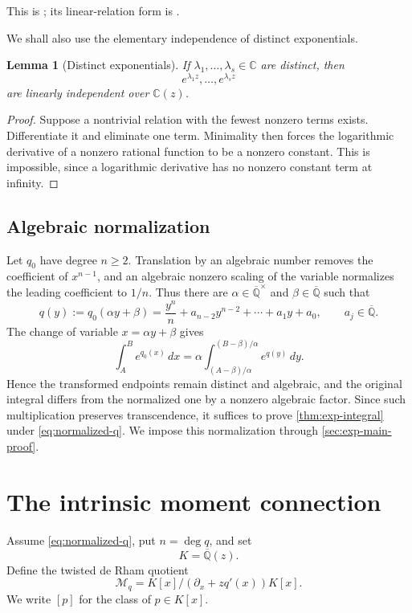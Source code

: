\documentclass[11pt]{article}
\numberwithin{equation}{section}
\newtheorem{lemma}[lemma]{Lemma}
\theoremstyle{definition}
\theoremstyle{remark}
\newcommand{\C}{\mathbb C}
\newcommand{\Qbar}{\overline{\mathbb Q}}
\newcommand{\Mcal}{\mathcal M}
\begin{document}
This is \cite[Theorem~1.3]{Beukers}; its linear-relation form is
\cite[Theorem~3.2]{Beukers}.

We shall also use the elementary independence of distinct exponentials.

\begin{lemma}[Distinct exponentials]\label{lem:exp-independent}
If $\lambda_1,\ldots,\lambda_s\in\C$ are distinct, then
\[
  e^{\lambda_1 z},\ldots,e^{\lambda_s z}
\]
are linearly independent over $\C(z)$.
\end{lemma}

\begin{proof}
Suppose a nontrivial relation with the fewest nonzero terms exists.  Differentiate it and eliminate one term.  Minimality then forces the logarithmic derivative of a nonzero rational function to be a nonzero constant.  This is impossible, since a logarithmic derivative has no nonzero constant term at infinity.
\end{proof}

\subsection{Algebraic normalization}

Let $q_0$ have degree $n\ge2$.  Translation by an algebraic number removes the coefficient of $x^{n-1}$, and an algebraic nonzero scaling of the variable normalizes the leading coefficient to $1/n$.  Thus there are $\alpha\in\Qbar^\times$ and $\beta\in\Qbar$ such that
\begin{equation}\label{eq:normalized-q}
  q(y):=q_0(\alpha y+\beta)
  =\frac{y^n}{n}+a_{n-2}y^{n-2}+\cdots+a_1y+a_0,
  \qquad a_j\in\Qbar.
\end{equation}
The change of variable $x=\alpha y+\beta$ gives
\[
  \int_A^B e^{q_0(x)}\,dx
  =\alpha\int_{(A-\beta)/\alpha}^{(B-\beta)/\alpha}
  e^{q(y)}\,dy.
\]
Hence the transformed endpoints remain distinct and algebraic, and the original integral differs from the normalized one by a nonzero algebraic factor.  Since such multiplication preserves transcendence, it suffices to prove \cref{thm:exp-integral} under \eqref{eq:normalized-q}.  We impose this normalization through \cref{sec:exp-main-proof}.

\section{The intrinsic moment connection}\label{sec:exp-moment}

Assume \eqref{eq:normalized-q}, put $n=\deg q$, and set
\[
  K=\Qbar(z).
\]
Define the twisted de Rham quotient
\begin{equation}\label{eq:twisted-module}
  \Mcal_q
  =K[x]\big/(\partial_x+zq'(x))K[x].
\end{equation}
We write $[p]$ for the class of $p\in K[x]$.
\end{document}
